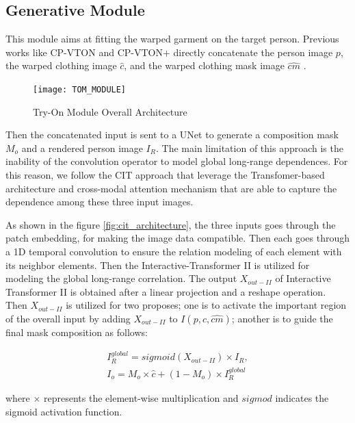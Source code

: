 \subsection{Generative Module}
This module aims at fitting the warped garment on the target person. Previous works like CP-VTON and CP-VTON+ directly concatenate the person image $p$, the warped clothing image
$\hat{c}$, and the warped clothing mask image $\hat{cm}$ . 

\begin{figure}[h]
\centering
\texttt{[image: TOM\_MODULE]}
\caption{Try-On Module Overall Architecture}
\label{fig:TOM_MODULE}
\end{figure}

Then the concatenated input is sent to a UNet \cite{u-net} to generate a composition mask $M_o$ and a rendered person image $I_R$. The main limitation of this approach is the inability of the convolution operator to model global long-range dependences. For this reason, we follow the CIT \cite{CIT} approach that leverage the Transfomer-based architecture and cross-modal attention mechanism that are able to capture the dependence among these three input images.


As shown in the figure \ref{fig:cit_architecture}, the three inputs goes through the patch embedding, for making the image data compatible.  Then each goes through a 1D temporal convolution to ensure the relation modeling of each element with its neighbor elements. Then the Interactive-Transformer II is utilized for modeling the global long-range correlation. The output $X_{out-II}$ of Interactive Transformer II is obtained after a linear projection and a reshape operation. Then $X_{out-II}$ is utilized for two proposes; one is to activate the important region of the overall input by adding $X_{out-II}$ to $I(p,\hat{c},\hat{cm})$; another is to guide the final mask composition as follows:

\begin{equation}
  \begin{aligned}
    I_{R}^{global} = sigmoid(X_{out-II}) \times I_R, \\
I_o = M_o \times \hat{c} + (1 - M_o) \times I_{R}^{global}
  \end{aligned}
\end{equation}

where $\times$ represents the element-wise multiplication and $sigmod$ indicates the sigmoid activation function.

